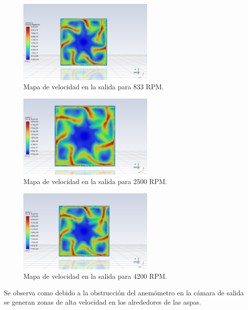 \begin{figure}[ht!]
    \centering
    \includegraphics[width=0.6\textwidth]{images/sal1.png}
    \caption{Mapa de velocidad en la salida para 833 RPM.}
    \label{fig:sal1}
\end{figure}

\pagebreak

\begin{figure}[ht!]
    \centering
    \includegraphics[width=0.6\textwidth]{images/sal2.png}
    \caption{Mapa de velocidad en la salida para 2500 RPM.}
    \label{fig:sal2}
\end{figure}

\begin{figure}[ht!]
    \centering
    \includegraphics[width=0.6\textwidth]{images/sal3.png}
    \caption{Mapa de velocidad en la salida para 4200 RPM.}
    \label{fig:sal3}
\end{figure}

Se observa como debido a la obstrucción del anemómetro en la cámara de salida se generan zonas de alta velocidad en los alrededores de las aspas. 


